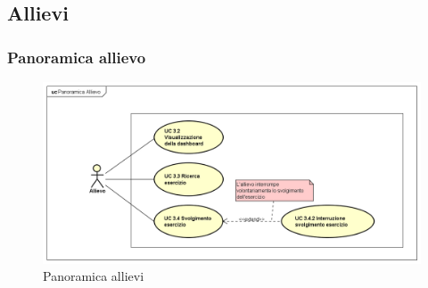\subsection{Allievi}
\subsubsection{Panoramica allievo}

\begin{figure}[H]
\centering
\includegraphics[width=17cm]{img/PanoramicaAllievi.png} 
\caption{Panoramica allievi}\label{fig:31}
\end{figure}


